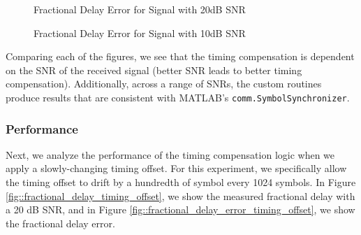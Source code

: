 \documentclass{article}
\begin{document}
\begin{figure}[H]
	\centerline{}
	\caption{Fractional Delay Error for Signal with 20dB SNR}
	\label{fig::delay_error_20dB_snr}
\end{figure}

\begin{figure}[H]
	\centerline{}
	\caption{Fractional Delay Error for Signal with 10dB SNR}
	\label{fig::delay_error_10dB_snr}
\end{figure}

\noindent Comparing each of the figures, we see that the timing compensation is dependent on the SNR of the received signal (better SNR leads to better timing compensation). Additionally, across a range of SNRs, the custom routines produce results that are consistent with MATLAB's \texttt{comm.SymbolSynchronizer}.

\subsubsection{Performance}

Next, we analyze the performance of the timing compensation logic when we apply a slowly-changing timing offset. For this experiment, we specifically allow the timing offset to drift by a hundredth of symbol every 1024 symbols. In Figure \ref{fig::fractional_delay_timing_offset}, we show the measured fractional delay with a 20 dB SNR, and in Figure \ref{fig::fractional_delay_error_timing_offset}, we show the fractional delay error.
\end{document}
